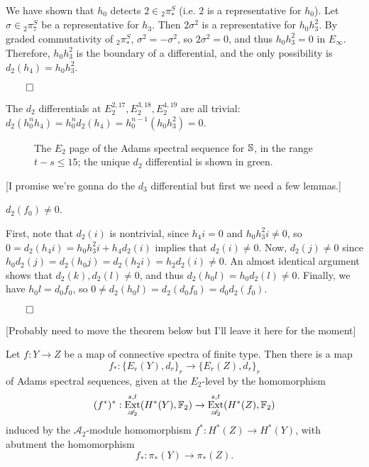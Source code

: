 \documentclass{MetricNotes2023}
\def\bb{\ensuremath\mathbb}
\def\A{\ensuremath{\mathscr{A}_2}}
\DeclareMathOperator{\Ext}{Ext}
\def\done{\begin{flushright}\vspace{-4.35ex}\(\qed\)\end{flushright}}
\begin{document}
\begin{ourproof}
We have shown that \(h_0\) detects \(2\in \text{}_2\pi_*^S\) (i.e. \(2\) is a representative for \(h_0\)). Let \(\sigma\in \text{}_2\pi_7^S\) be a representative for \(h_3\). Then \(2 \sigma^2\) is a representative for \(h_0h_3^2\). By graded commutativity of \(\text{}_2\pi_*^S\), \(\sigma^2=-\sigma^2\), so \(2 \sigma^2=0\), and thus \(h_0h_3^2=0\) in \(E_\infty\). Therefore, \(h_0h_3^2\) is the boundary of a differential, and the only possibility is \(d_2(h_4)=h_0h_3^2\).\done
\end{ourproof}

The \(d_2\) differentials at \(E_2^{2, 17},  E_2^{3, 18}, E_2^{4, 19}\) are all trivial: \(d_2(h_0^nh_4)=h_0^nd_2(h_4)=h_0^{n-1}(h_0h_3^2)=0\). 

\begin{figure}[H]
\centering

\caption{The \(E_2\) page of the Adams spectral sequence for \(\bb{S}\), in the range \(t-s\leq 15\); the unique \(d_2\) differential is shown in green.}
\end{figure}

[I promise we're gonna do the \(d_3\) differential but first we need a few lemmas.]

\begin{lemma}
\(d_2(f_0)\neq 0\).
\end{lemma}

\begin{ourproof}
First, note that \(d_2(i)\) is nontrivial, since \(h_4i=0\) and \(h_0h_3^2i\neq 0\), so \(0=d_2(h_4i)=h_0h_3^2i+h_4d_2(i)\) implies that \(d_2(i)\neq 0\). Now, \(d_2(j)\neq 0\) since \(h_0d_2(j)=d_2(h_0j)=d_2(h_2i)=h_2d_2(i)\neq 0\). An almost identical argument shows that \(d_2(k), d_2(l)\neq0\), and thus \(d_2(h_0l)=h_0d_2(l)\neq 0\). Finally, we have \(h_0l=d_0f_0\), so \(0\neq d_2(h_0l)=d_2(d_0f_0)=d_0d_2(f_0)\).\done
\end{ourproof}

[Probably need to move the theorem below but I'll leave it here for the moment]

\begin{theorem}\label{2504141019}
Let \(f : Y \to Z\) be a map of connective spectra of finite type. Then there is a map
\[f_* : \{E_r(Y), d_r\}_r \to \{E_r(Z), d_r\}_r\]
of Adams spectral sequences, given at the \(E_2\)-level by the homomorphism
\[(f^*)^* : \Ext_{\A}^{s,t}(H^*(Y), \bb{F}_2) \to \Ext^{s,t}_{\A}(H^*(Z), \bb{F}_2)\]
induced by the \(\A\)-module homomorphism \(f^* : H^*(Z)\to H^*(Y)\), with abutment the homomorphism 
\[f_* : \pi_*(Y) \to \pi_*(Z).\]
\end{theorem}
\end{document}
